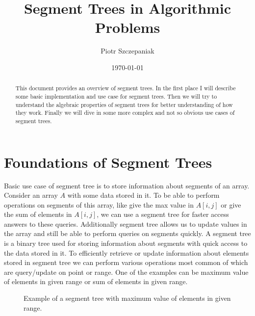 \documentclass[11pt]{article}
\title{Segment Trees in Algorithmic Problems}
\author{Piotr Szczepaniak}
\date{\today}
\begin{document}
\maketitle

\tableofcontents

\begin{abstract}
This document provides an overview of segment trees. In the first place
I will describe some basic implementation and use case for segment trees.
Then we will try to understand the algebraic properties of segment trees for
better understanding of how they work. Finally we will dive in some more complex and not so obvious
use cases of segment trees.
\end{abstract}

\section{Foundations of Segment Trees}
Basic use case of segment tree is to store information about segments of an array.
Consider an array \(A\) with some data stored in it. To be able to perform operations on segments of this array, like
give the max value in \(A[i, j]\) or give the sum of elements in \(A[i, j]\), we can use a segment tree for faster
access answers to these queries. Additionally segment tree allows us to update values in the array and still be able to perform queries on segments quickly.
A segment tree is a binary tree used for storing information about segments with quick access to the data stored in it. 
To efficiently retrieve or update information about elements stored 
in segment tree we can perform various operations most common of which are
query/update on point or range.
One of the examples can be maximum value of 
elements in given range or sum of elements in given range.

\begin{figure}[H]
    \centering
    
    \caption{Example of a segment tree with maximum value of elements in given range.}
    \label{fig:segment_tree_1}
\end{figure}
\end{document}
